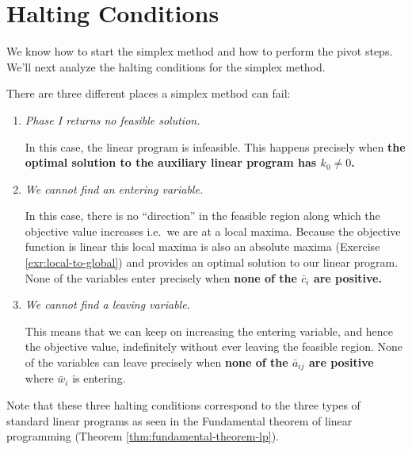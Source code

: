 \documentclass[
]{book}
\theoremstyle{definition}
\theoremstyle{definition}
\theoremstyle{definition}
\theoremstyle{definition}
\theoremstyle{remark}
\begin{document}
\hypertarget{halting-conditions}{%
\chapter{Halting Conditions}\label{halting-conditions}}

We know how to start the simplex method and how to perform the pivot steps. We'll next analyze the
halting conditions for the simplex method.

There are three different places a simplex method can fail:

\begin{enumerate}
\def\labelenumi{\arabic{enumi}.}
\item
  \emph{Phase I returns no feasible solution.}

  In this case, the linear program is infeasible. This happens precisely when \textbf{the optimal
  solution to the auxiliary linear program has \(k_0 \neq 0\).}
\item
  \emph{We cannot find an entering variable.}

  In this case, there is no ``direction'' in the feasible region along which the objective value
  increases i.e.~we are at a local maxima. Because the objective function is linear this local
  maxima is also an absolute maxima (Exercise \ref{exr:local-to-global}) and provides an optimal
  solution to our linear program. None of the variables enter precisely when \textbf{none of the
  \(\bar{c}_i\) are positive.}
\item
  \emph{We cannot find a leaving variable.}

  This means that we can keep on increasing the entering variable, and hence the objective value,
  indefinitely without ever leaving the feasible region. None of the variables can leave precisely
  when \textbf{none of the \(\bar{a}_{ij}\) are positive} where \(\bar{w}_i\) is entering.
\end{enumerate}

Note that these three halting conditions correspond to the three types of standard linear programs
as seen in the Fundamental theorem of linear programming (Theorem
\ref{thm:fundamental-theorem-lp}).
\end{document}
